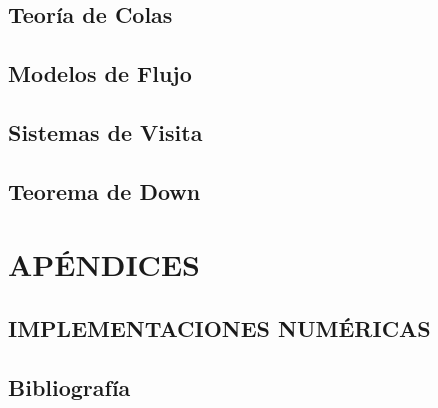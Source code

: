 \documentclass{report}
\begin{document}
\chapter{Teoría de Colas}


\chapter{Modelos de Flujo}


\chapter{Sistemas de Visita}


\chapter{Teorema de Down}


\part{APÉNDICES}

\chapter{IMPLEMENTACIONES NUMÉRICAS}


\chapter{Bibliografía}

\end{document}
